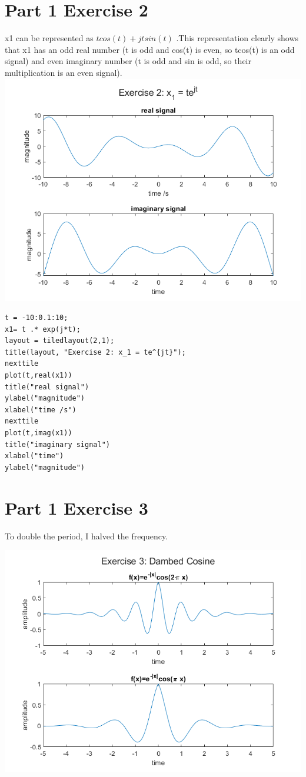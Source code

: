 \documentclass[11pt]{article}
\begin{document}
\pagebreak
\section{Part 1 Exercise 2}

x1 can be represented as $tcos(t) + jtsin(t)$ .This representation clearly shows that x1 has an odd real number (t is odd and cos(t) is even, so tcos(t) is an odd signal) and even imaginary number (t is odd and sin is odd, so their multiplication is an even signal).\\

\includegraphics[width=\textwidth]{Exercise2.png}

\begin{lstlisting}
t = -10:0.1:10;
x1= t .* exp(j*t);
layout = tiledlayout(2,1);
title(layout, "Exercise 2: x_1 = te^{jt}");
nexttile
plot(t,real(x1))
title("real signal")
ylabel("magnitude")
xlabel("time /s")
nexttile
plot(t,imag(x1))
title("imaginary signal")
xlabel("time")
ylabel("magnitude")
\end{lstlisting}

\pagebreak 
\section{Part 1 Exercise 3}

To double the period, I halved the frequency.

\includegraphics[width=\textwidth]{Exercise3.png}
\end{document}
